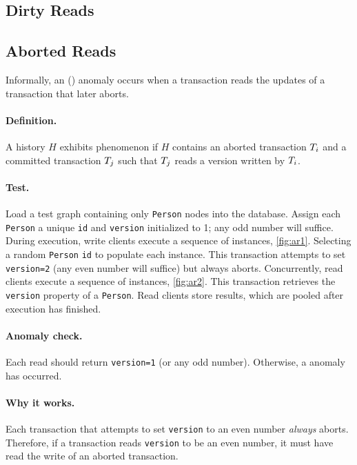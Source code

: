 \subsection{Dirty Reads}
\label{sec:dirty-reads-1}

\subsection*{Aborted Reads}

Informally, an  () anomaly occurs when a transaction reads the updates of a transaction that later aborts.

\paragraph{Definition.}
A history $H$ exhibits phenomenon  if $H$ contains an aborted transaction $T_i$ and a committed transaction $T_j$ such that $T_j$ reads a version written by $T_i$.

\paragraph{Test.}
Load a test graph containing only \texttt{Person} nodes into the database.
Assign each \texttt{Person} a unique \texttt{id} and \texttt{version} initialized to 1; any odd number will suffice.
During execution, write clients execute a sequence of  instances, \autoref{fig:ar1}.
Selecting a random \texttt{Person} \texttt{id} to populate each instance.
This transaction attempts to set \texttt{version=2} (any even number will suffice) but always aborts.
Concurrently, read clients execute a sequence of  instances, \autoref{fig:ar2}.
This transaction retrieves the \texttt{version} property of a \texttt{Person}.
Read clients store results, which are pooled after execution has finished.

\paragraph{Anomaly check.}
Each read should return \texttt{version=1} (or any odd number).
Otherwise, a  anomaly has occurred.

\paragraph{Why it works.}
Each transaction that attempts to set \texttt{version} to an even number \emph{always} aborts.
Therefore, if a transaction reads \texttt{version} to be an even number, it must have read the write of an aborted transaction.


